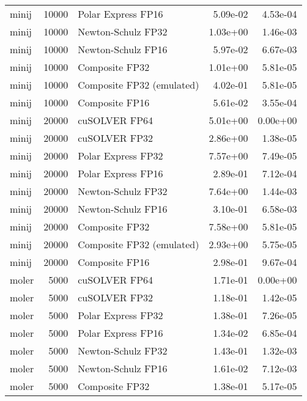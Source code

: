 \begin{table}
\begin{tabular}{lrlrr}
    minij & 10000 &        Polar Express FP16 &  5.09e-02 &        4.53e-04 \\
    minij & 10000 &        Newton-Schulz FP32 &  1.03e+00 &        1.46e-03 \\
    minij & 10000 &        Newton-Schulz FP16 &  5.97e-02 &        6.67e-03 \\
    minij & 10000 &            Composite FP32 &  1.01e+00 &        5.81e-05 \\
    minij & 10000 & Composite FP32 (emulated) &  4.02e-01 &        5.81e-05 \\
    minij & 10000 &            Composite FP16 &  5.61e-02 &        3.55e-04 \\
    minij & 20000 &             cuSOLVER FP64 &  5.01e+00 &        0.00e+00 \\
    minij & 20000 &             cuSOLVER FP32 &  2.86e+00 &        1.38e-05 \\
    minij & 20000 &        Polar Express FP32 &  7.57e+00 &        7.49e-05 \\
    minij & 20000 &        Polar Express FP16 &  2.89e-01 &        7.12e-04 \\
    minij & 20000 &        Newton-Schulz FP32 &  7.64e+00 &        1.44e-03 \\
    minij & 20000 &        Newton-Schulz FP16 &  3.10e-01 &        6.58e-03 \\
    minij & 20000 &            Composite FP32 &  7.58e+00 &        5.81e-05 \\
    minij & 20000 & Composite FP32 (emulated) &  2.93e+00 &        5.75e-05 \\
    minij & 20000 &            Composite FP16 &  2.98e-01 &        9.67e-04 \\
    moler &  5000 &             cuSOLVER FP64 &  1.71e-01 &        0.00e+00 \\
    moler &  5000 &             cuSOLVER FP32 &  1.18e-01 &        1.42e-05 \\
    moler &  5000 &        Polar Express FP32 &  1.38e-01 &        7.26e-05 \\
    moler &  5000 &        Polar Express FP16 &  1.34e-02 &        6.85e-04 \\
    moler &  5000 &        Newton-Schulz FP32 &  1.43e-01 &        1.32e-03 \\
    moler &  5000 &        Newton-Schulz FP16 &  1.61e-02 &        7.12e-03 \\
    moler &  5000 &            Composite FP32 &  1.38e-01 &        5.17e-05 \\

\end{tabular}
\end{table}
